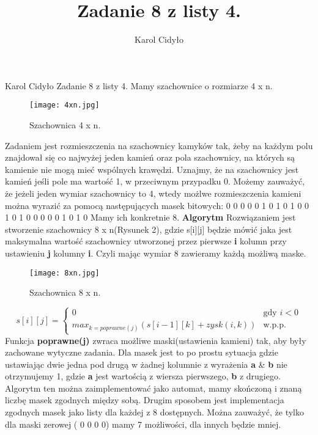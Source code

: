 \documentclass[a4paper,10pt]{article}
\author{Karol Cidyło}
\title {Zadanie 8 z listy 4.}
\begin{document}
Karol Cidyło \newline \newline \newline
Zadanie 8 z listy 4. \newline \newline
Mamy szachownice o rozmiarze 4 x n. \newline
\begin{figure}[h!]
  \texttt{[image: 4xn.jpg]}
  \caption{Szachownica 4 x n.}
  \label{fig:boat1}
\end{figure}


Zadaniem jest  rozmieszczenia na szachownicy kamyków tak, żeby na każdym polu znajdował się co najwyżej jeden kamień oraz pola szachownicy, na których są kamienie nie mogą mieć wspólnych krawędzi. Uznajmy, że na szachownicy jest kamień jeśli pole ma wartość 1, w przeciwnym przypadku 0. Możemy zauważyć, że jeżeli jeden wymiar szachownicy to 4, wtedy możlwe rozmieszczenia kamieni można wyrazić za pomocą następujących masek bitowych:  0 0 0  0 0 1  0 1 0  1 0 0  1 0 1  0 0 0  0 0 1  0 1 0 \newline  \newline
Mamy ich konkretnie 8.\newline \newline
\textbf{Algorytm}\newline
Rozwiązaniem jest stworzenie szachownicy 8 x n(Rysunek 2), gdzie s[i][j] będzie mówić jaka jest maksymalna wartość szachownicy utworzonej przez pierwsze \textbf{i}  kolumn przy ustawieniu \textbf{j} kolumny \textbf{i}. Czyli mając wymiar 8 zawieramy każdą możliwą maske.
\begin{figure}[h!]
  \texttt{[image: 8xn.jpg]}
  \caption{Szachownica 8 x n.}
  \label{fig:boat2}
\end{figure}
$$
s[i][j] = \left\{ \begin{array}{ll}
0 & \textrm{gdy $i < 0$}\\
max_{k=poprawne(j)}( s[i-1][k] + zysk(i, k)) & \textrm{w.p.p.}
\end{array} \right.
$$\newline
Funkcja  \textbf{poprawne(j)} zwraca możliwe maski(ustawienia kamieni) tak, aby były zachowane wytyczne zadania. Dla masek jest to po prostu sytuacja gdzie ustawiając dwie jedna pod drugą w żadnej kolumnie z wyrażenia \textbf{a} \& \textbf{b} nie otrzymujemy 1, gdzie \textbf{a} jest wartością z wiersza pierwszego, \textbf{b} z drugiego. Algorytm ten można zaimplementować jako automat, mamy skończoną i znaną liczbę masek zgodnych między sobą. Drugim sposobem jest implementacja zgodnych masek jako listy dla każdej z 8 dostępnych. Można zauważyć, że tylko dla maski zerowej ( 0 0 0 0) mamy 7 możliwości, dla innych będzie mniej. \newline
\end{document}
